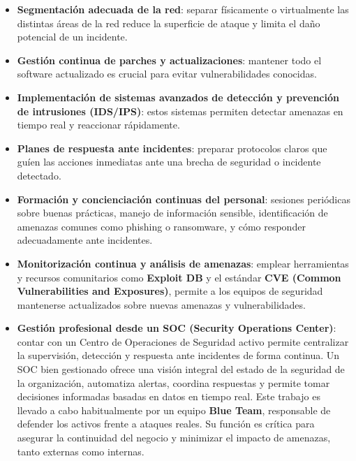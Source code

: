 \documentclass[a4paper, 10pt]{article}
\begin{document}
    \begin{itemize}
    \item \textbf{Segmentación adecuada de la red}: separar físicamente o virtualmente las distintas áreas de la red reduce la superficie de ataque y limita el daño potencial de un incidente.
    
    \item \textbf{Gestión continua de parches y actualizaciones}: mantener todo el software actualizado es crucial para evitar vulnerabilidades conocidas.
    
    \item \textbf{Implementación de sistemas avanzados de detección y prevención de intrusiones (IDS/IPS)}: estos sistemas permiten detectar amenazas en tiempo real y reaccionar rápidamente.
    
    \item \textbf{Planes de respuesta ante incidentes}: preparar protocolos claros que guíen las acciones inmediatas ante una brecha de seguridad o incidente detectado.
    
    \item \textbf{Formación y concienciación continuas del personal}: sesiones periódicas sobre buenas prácticas, manejo de información sensible, identificación de amenazas comunes como phishing o ransomware, y cómo responder adecuadamente ante incidentes.
    
    \item \textbf{Monitorización continua y análisis de amenazas}: emplear herramientas y recursos comunitarios como \textbf{Exploit DB} y el estándar \textbf{CVE (Common Vulnerabilities and Exposures)}, permite a los equipos de seguridad mantenerse actualizados sobre nuevas amenazas y vulnerabilidades.
    
    \item \textbf{Gestión profesional desde un SOC (Security Operations Center)}: contar con un Centro de Operaciones de Seguridad activo permite centralizar la supervisión, detección y respuesta ante incidentes de forma continua. Un SOC bien gestionado ofrece una visión integral del estado de la seguridad de la organización, automatiza alertas, coordina respuestas y permite tomar decisiones informadas basadas en datos en tiempo real. Este trabajo es llevado a cabo habitualmente por un equipo \textbf{Blue Team}, responsable de defender los activos frente a ataques reales. Su función es crítica para asegurar la continuidad del negocio y minimizar el impacto de amenazas, tanto externas como internas.
    \end{itemize}
    
\end{document}
